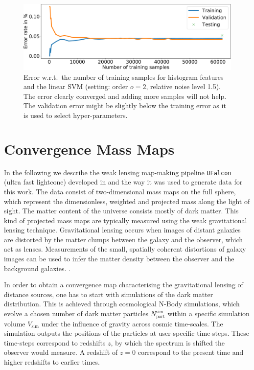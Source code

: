 \documentclass[final,twocolumn,3p,times,sort&compress]{elsarticle}
\newcommand{\1}{\b{1}}              %
\newcommand{\0}{\b{0}}              %
\newcommand{\pkg}[1]{\texttt{#1}}
\begin{document}
\begin{figure}
	\centering
	\includegraphics[width=\linewidth]{hist_error_order2_noise1_5}
	\caption{Error w.r.t.\ the number of training samples for histogram features and the linear SVM (setting: order $o=2$, relative noise level 1.5). The error clearly converged and adding more samples will not help. The validation error might be slightly below the training error as it is used to select hyper-parameters.}
	\label{fig:hist_error_evolution}
\end{figure}

\section{Convergence Mass Maps}
\label{sec:convergence_mass_maps}

In the following we describe the weak lensing map-making pipeline \pkg{UFalcon} (ultra fast lightcone) developed in \citep{sgier2018fastgeneration} and the way it was used to generate data for this work.
The data consist of two-dimensional mass maps on the full sphere, which represent the dimensionless, weighted and projected mass along the light of sight.
The matter content of the universe consists mostly of dark matter.
This kind of projected mass maps are typically measured using the weak gravitational lensing technique.
Gravitational lensing occurs when images of distant galaxies are distorted by the matter clumps between the galaxy and the observer, which act as lenses.
Measurements of the small, spatially coherent distortions of galaxy images can be used to infer the matter density between the observer and the background galaxies.
\citep[see][for a review of gravitational lensing]{bartelman2010gravitationallensing}.

In order to obtain a convergence map characterising the gravitational lensing of distance sources, one has to start with simulations of the dark matter distribution.
This is achieved through cosmological N-Body simulations, which evolve a chosen number of dark matter particles $N_\mathrm{part}^\mathrm{sim}$ within a specific simulation volume $V_\mathrm{sim}$ under the influence of gravity across cosmic time-scales. The simulation outputs the positions of the particles at user-specific time-steps. These time-steps correspond to redshifts $z$, by which the spectrum is shifted the observer would measure. A redshift of $z=0$ correspond to the present time and higher redshifts to earlier times.
\end{document}
